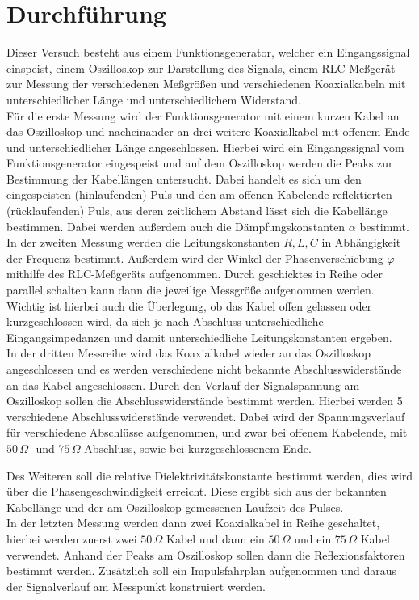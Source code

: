 \section{Durchführung}
\label{sec:Durchführung}

Dieser Versuch besteht aus einem Funktionsgenerator, welcher ein Eingangssignal einspeist, einem Oszilloskop zur Darstellung des Signals, einem RLC-Meßgerät zur Messung der verschiedenen Meßgrößen und verschiedenen Koaxialkabeln mit unterschiedlicher Länge und unterschiedlichem Widerstand. \\
Für die erste Messung wird der Funktionsgenerator mit einem kurzen Kabel an das Oszilloskop und nacheinander an drei weitere Koaxialkabel mit offenem Ende und unterschiedlicher Länge angeschlossen. Hierbei wird ein Eingangssignal vom Funktionsgenerator eingespeist und auf dem Oszilloskop werden die Peaks zur Bestimmung der Kabellängen untersucht. Dabei handelt es sich um den eingespeisten (hinlaufenden) Puls und den am offenen Kabelende reflektierten (rücklaufenden) Puls, aus deren zeitlichem Abstand lässt sich die Kabellänge bestimmen. Dabei werden außerdem auch die Dämpfungskonstanten $\alpha$ bestimmt. \\
In der zweiten Messung werden die Leitungskonstanten $R, L, C$ in Abhängigkeit der Frequenz bestimmt. Außerdem wird der Winkel der Phasenverschiebung $\varphi$ mithilfe des RLC-Meßgeräts aufgenommen. Durch geschicktes in Reihe oder parallel schalten kann dann die jeweilige Messgröße aufgenommen werden. Wichtig ist hierbei auch die Überlegung, ob das Kabel offen gelassen oder kurzgeschlossen wird, da sich je nach Abschluss unterschiedliche Eingangsimpedanzen und damit unterschiedliche Leitungskonstanten ergeben. \\
In der dritten Messreihe wird das Koaxialkabel wieder an das Oszilloskop angeschlossen und es werden verschiedene nicht bekannte Abschlusswiderstände an das Kabel angeschlossen. Durch den Verlauf der Signalspannung am Oszilloskop sollen die Abschlusswiderstände bestimmt werden. Hierbei werden 5 verschiedene Abschlusswiderstände verwendet.
Dabei wird der Spannungsverlauf für verschiedene Abschlüsse aufgenommen, und zwar bei offenem Kabelende, mit $50\,\Omega$- und $75\,\Omega$-Abschluss, sowie bei kurzgeschlossenem Ende.

Des Weiteren soll die relative Dielektrizitätskonstante bestimmt werden, dies wird über die Phasengeschwindigkeit erreicht. Diese ergibt sich aus der bekannten Kabellänge und der am Oszilloskop gemessenen Laufzeit des Pulses. \\
In der letzten Messung werden dann zwei Koaxialkabel in Reihe geschaltet, hierbei werden zuerst zwei $50\,\Omega$ Kabel und dann ein $50\,\Omega$ und ein $75\,\Omega$ Kabel verwendet. Anhand der Peaks am Oszilloskop sollen dann die Reflexionsfaktoren bestimmt werden. Zusätzlich soll ein Impulsfahrplan aufgenommen und daraus der Signalverlauf am Messpunkt konstruiert werden.

\clearpage